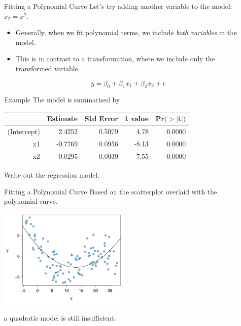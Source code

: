 \begin{frame}{Fitting a Polynomial Curve}
    Let's try adding another variable to the model: $x_2 = x^2$.
    
    \begin{itemize}
        \item Generally, when we fit polynomial terms, we include \textit{both variables} in the model.
        \item This is in contrast to a transformation, where we include only the transformed variable.
    \end{itemize}
    
    \[
        y = \beta_0 + \beta_1x_1 + \beta_2x_2 + \epsilon
    \]
\end{frame}

\begin{frame}{Example}
    The model is summarized by
    
    \begin{table}[h]
        \centering
        \begin{tabular}{r rrrr}
            \hline
             & Estimate & Std Error & t value & Pr$(>|$t$|)$ \\
            \hline
            (Intercept) & 2.4252 & 0.5079 & 4.78 & 0.0000 \\
            x1 & -0.7769 & 0.0956 & -8.13 & 0.0000 \\
            x2 & 0.0295 & 0.0039 & 7.55 & 0.0000 \\
            \hline
        \end{tabular}
    \end{table}
    Write out the regression model.
\end{frame}

\begin{frame}{Fitting a Polynomial Curve}
    Based on the scatterplot overlaid with the polynomial curve,
    \begin{center}
        \includegraphics[width=2.5in]{images/nonlindata4.png}
    \end{center}
    a quadratic model is still insufficient.
\end{frame}

